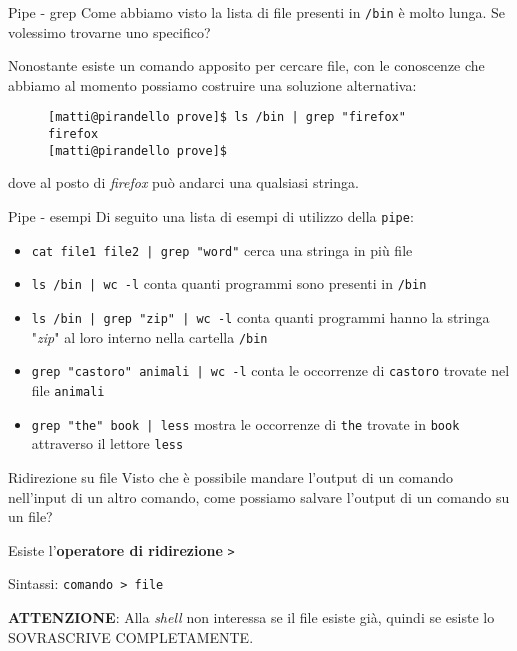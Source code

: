 \begin{frame}[fragile]{Pipe - grep}
  Come abbiamo visto la lista di file presenti in \texttt{/bin} è molto lunga.
  Se volessimo trovarne uno specifico? \bigskip

  Nonostante esiste un comando apposito per cercare file, con le conoscenze che 
  abbiamo al momento possiamo costruire una soluzione alternativa:\bigskip\pause

  \begin{figure}
    \begin{lstlisting}
[matti@pirandello prove]$ ls /bin | grep "firefox" 
firefox
[matti@pirandello prove]$
    \end{lstlisting}
  \end{figure}
  
  dove al posto di \textit{firefox} può andarci una qualsiasi stringa. \bigskip
\end{frame}

\begin{frame}{Pipe - esempi}
  Di seguito una lista di esempi di utilizzo della \texttt{pipe}:
  \begin{itemize}
    \item \texttt{cat file1 file2 | grep "word"} cerca una stringa in più file
    \item \texttt{ls /bin | wc -l} conta quanti programmi sono presenti in 
      \texttt{/bin}
    \item \texttt{ls /bin | grep "zip" | wc -l} conta quanti programmi hanno
      la stringa "\textit{zip}" al loro interno nella cartella \texttt{/bin}
    \item \texttt{grep "castoro" animali | wc -l} conta le occorrenze di 
      \texttt{castoro} trovate nel file \texttt{animali}
    \item \texttt{grep "the" book | less} mostra le occorrenze di \texttt{the} 
      trovate in \texttt{book} attraverso il lettore \texttt{less}
  \end{itemize}
\end{frame}

\begin{frame}{Ridirezione su file}
  Visto che è possibile mandare l'output di un comando nell'input di un altro 
  comando, come possiamo salvare l'output di un comando su un file?

  Esiste l'\textbf{operatore di ridirezione} \texttt{>}\bigskip

  Sintassi: \texttt{comando > file}\bigskip

  \textbf{ATTENZIONE}: Alla \textit{shell} non interessa se il file esiste già, quindi se 
  esiste lo SOVRASCRIVE COMPLETAMENTE.
\end{frame}


